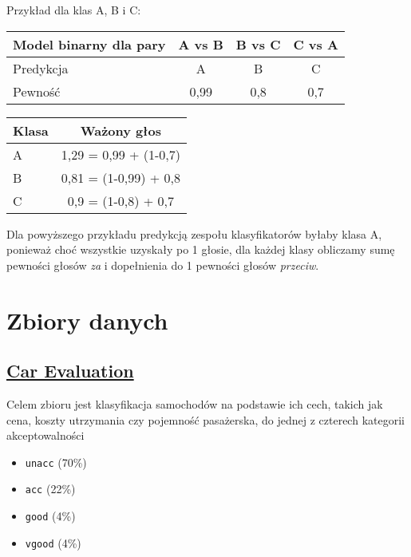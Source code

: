 \documentclass{article}
\begin{document}
Przykład dla klas A, B i C:

\begin{table}[ht]
\centering
\begin{tabular}{|l|c|c|c|}
\hline
Model binarny dla pary & A vs B & B vs C & C vs A \\ \hline
Predykcja              & A      & B      & C      \\
Pewność                & 0,99   & 0,8    & 0,7    \\ \hline
\end{tabular}
\label{tab:binary-pairs}
\end{table}

\begin{table}[ht]
\centering
\begin{tabular}{|l|c|}
\hline
Klasa & Ważony głos \\ \hline
A     & 1,29 = 0,99 + (1-0,7) \\
B     & 0,81 = (1-0,99) + 0,8 \\
C     & 0,9 = (1-0,8) + 0,7 \\ \hline
\end{tabular}
\label{tab:weighted-votes}
\end{table}

Dla powyższego przykładu predykcją zespołu klasyfikatorów byłaby klasa A, ponieważ choć wszystkie uzyskały po 1 głosie,
dla każdej klasy obliczamy sumę pewności głosów \textit{za} i dopełnienia do 1 pewności głosów \textit{przeciw}.

\section{Zbiory danych}


\subsection{\href{https://archive.ics.uci.edu/dataset/19/car+evaluation}{Car Evaluation}}



Celem zbioru jest klasyfikacja samochodów na podstawie ich cech, takich jak cena, koszty utrzymania czy pojemność pasażerska, do jednej z czterech kategorii akceptowalności

\begin{itemize}
    \item \texttt{unacc} (70\%)
    \item \texttt{acc} (22\%)
    \item \texttt{good} (4\%)
    \item \texttt{vgood} (4\%)
\end{itemize}
\end{document}
